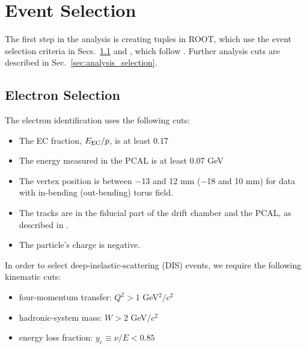 \section{Event Selection} \label{sec:eventselection}
The first step in the analysis is creating tuples in ROOT, which use the event selection criteria in Secs.~\ref{sec:electron_selection} and 
\label{sec:hadron_selection}, which follow \cite{RGANote}.  Further analysis cuts are described in Sec.~\ref{sec:analysis_selection}.
\subsection{Electron Selection}
\label{sec:electron_selection}
The electron identification uses the following cuts:

\begin{itemize}
    \item The EC fraction, $E_{\rm EC}/p$, is at least 0.17
    \item The energy measured in the PCAL is at least 0.07 GeV
    \item The vertex position is between $-$13 and 12 mm ($-$18 and 10 mm) for data with in-bending (out-bending) torus field.  
    \item The tracks are in the fiducial part of the drift chamber and the PCAL, as described in \cite{RGANote}.  
    \item The particle's charge is negative.
\end{itemize}


In order to select deep-inelastic-scattering (DIS) events, we require the following kinematic cuts:
\begin{itemize}
    \item four-momentum transfer: $Q^2>1$ GeV$^2/c^2$
    \item hadronic-system mass: $W>2$ GeV$/c^2$
    \item energy loss fraction: $y_e\equiv \nu/E<0.85$
\end{itemize}

